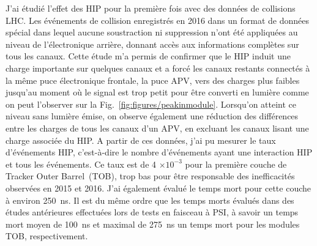 J'ai étudié l'effet des HIP pour la première fois avec des données de collisions LHC. Les  événements de collision enregistrés en 2016 dans un format de données spécial dans lequel aucune soustraction ni suppression n'ont été appliquées au niveau de l'électronique arrière, donnant accès aux informations complètes sur tous les canaux. Cette étude m'a permis de confirmer que le HIP induit une charge importante sur quelques canaux et a forcé les canaux restants connectés à la même puce électronique frontale, la puce APV, vers des charges plus faibles jusqu'au moment où le signal est trop petit pour être converti en lumière comme on peut l'observer sur la Fig.~\ref{fig:figures/peakinmodule}. Lorsqu'on atteint ce niveau sans lumière émise, on observe également une réduction des différences entre les charges de tous les canaux d'un APV, en excluant les canaux lisant une charge associée du HIP. A partir de ces données, j'ai pu mesurer le taux d'événements HIP, c'est-à-dire le nombre d'événements ayant une interaction HIP et  tous les événements. Ce taux est de 4 $\times 10^{-3} $ pour la première couche de Tracker Outer Barrel~(TOB), trop bas pour être responsable des inefficacités observées en 2015 et 2016. J'ai également évalué le temps mort pour cette couche à environ 250~ns. Il est du même ordre que les temps morts évalués dans des études antérieures effectuées lors de tests en faisceau à PSI, à savoir un temps mort moyen de 100~ns et maximal de 275~ns un temps mort pour les modules TOB, respectivement.

